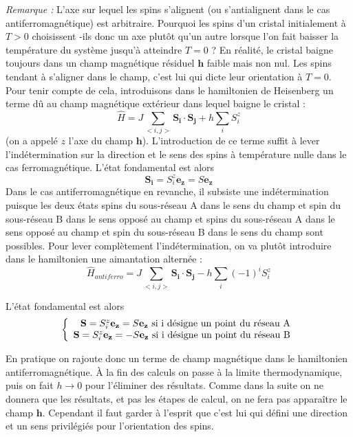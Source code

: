 \documentclass[a4paper, french]{report}
\newcommand{\h}{\ensuremath{\hat{H}}\xspace}
\newcommand{\1}{\ensuremath{\ket{\om_1\bom_1}}\xspace}
\newcommand{\2}{\ensuremath{\ket{\om_2\bom_2}}\xspace}
\begin{document}
\emph{Remarque :}
L'axe sur lequel les spins s'alignent (ou s'antialignent dans le cas antiferromagnétique) est arbitraire. Pourquoi les spins d'un cristal initialement à $T>0$ \og choisissent \fg{}-ils donc un axe plutôt qu'un autre lorsque l'on fait baisser la température du système jusqu'à atteindre $T=0$ ? En réalité, le cristal baigne toujours dans un champ magnétique résiduel $\mathbf{h}$ faible mais non nul. Les spins tendant à s'aligner dans le champ, c'est lui qui dicte leur orientation à $T=0$. Pour tenir compte de cela, introduisons dans le hamiltonien de Heisenberg un terme dû au champ magnétique extérieur dans lequel baigne le cristal :
\[
	\h=J\sum_{<i,j>}\mathbf{S_i\cdot S_j}+h\sum_{i}S_i^z
\]
(on a appelé $z$ l'axe du champ $\mathbf{h}$).
L'introduction de ce terme suffit à lever l'indétermination sur la direction et le sens des spins à température nulle dans le cas ferromagnétique. L'état fondamental est alors
\[
	\mathbf{S_i}=S_i^z\mathbf{e_z}=S\mathbf{e_z}
\]
Dans le cas antiferromagnétique en revanche, il subsiste une indétermination puisque les deux états \og spins du sous-réseau A dans le sens du champ et spin du sous-réseau B dans le sens opposé au champ \fg{} et \og spins du sous-réseau A dans le sens opposé au champ et spin du sous-réseau B dans le sens du champ \fg{} sont possibles. Pour lever complètement l'indétermination, on va plutôt introduire dans le hamiltonien une aimantation alternée :
\[
	\h_{antiferro}=J\sum_{<i,j>}\mathbf{S_i\cdot S_j}-h\sum_{i}(-1)^iS_i^z
\]

L'état fondamental est alors
\[
\left\{
	\begin{array}{r c l}
		\mathbf{S}=S_i^z\mathbf{e_z}=S\mathbf{e_z} \text{ si i désigne un point du réseau A}\\
		\mathbf{S}=S_i^z\mathbf{e_z}=-S\mathbf{e_z} \text{ si i désigne un point du réseau B}
	\end{array}
\right.
\]

En pratique on rajoute donc un terme de champ magnétique dans le hamiltonien antiferromagnétique. À la fin des calculs on passe à la limite thermodynamique, puis on fait $h\rightarrow 0$ pour l'éliminer des résultats. Comme dans la suite on ne donnera que les résultats, et pas les étapes de calcul, on ne fera pas apparaître le champ $\mathbf h$. Cependant il faut garder à l'esprit que c'est lui qui défini une direction et un sens privilégiés pour l'orientation des spins.
\end{document}
